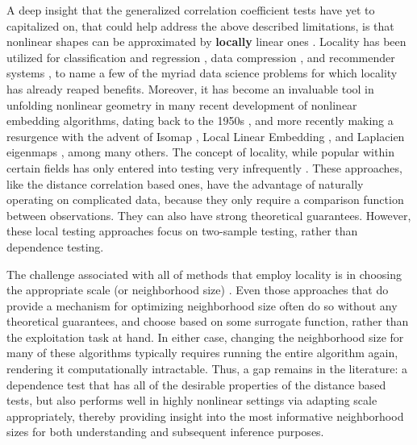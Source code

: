 \documentclass[11pt]{article}
\begin{document}
A deep insight that the generalized correlation coefficient tests  have yet to capitalized on, %
that could help address the above described limitations, 
is that nonlinear shapes can be approximated by \textbf{locally} linear ones \cite{Allard2012}.  Locality has been utilized for classification and regression  \cite{Stone1977}, data compression \cite{DaubechiesWaveletBook}, and recommender systems \cite{Sarwar2000}, to name a few of the myriad data science problems for which locality has already reaped benefits.
Moreover, it has become an invaluable tool in unfolding nonlinear geometry in many recent development of nonlinear embedding algorithms, dating back to the 1950s \cite{TorgersonBook}, and more recently making a resurgence with the advent of  Isomap \cite{TenenbaumSilvaLangford2000, SilvaTenenbaum2003}, Local Linear Embedding \cite{SaulRoweis2000, RoweisSaul2003}, and Laplacien eigenmaps \cite{BelkinNiyogi2003}, among many others. The concept of locality, while popular within certain fields has only entered into  testing very infrequently
\cite{David1966,Friedman1983,Schilling1986}.  These approaches, like the distance correlation based ones, have the advantage of naturally operating on complicated data, because they only require a comparison function between observations.  They can also have strong theoretical guarantees. 
However, these local testing approaches focus on two-sample testing, rather than dependence testing. 

The challenge associated with all of methods that employ locality is in choosing the appropriate scale (or neighborhood size) \cite{ShenVogelsteinPriebe2016}.  Even those approaches that do provide a mechanism for optimizing  neighborhood size often do so without any theoretical guarantees, and choose based on some surrogate function, rather than the exploitation task at hand. In either case, changing the neighborhood size for many of these algorithms typically requires running the entire algorithm again, rendering it computationally intractable. 
Thus, a gap remains in the literature: a dependence test that has all of the desirable properties of the distance based tests, but also performs well in highly nonlinear settings via adapting scale appropriately, thereby providing insight into the most informative neighborhood sizes for both understanding and subsequent inference purposes.  
\end{document}
